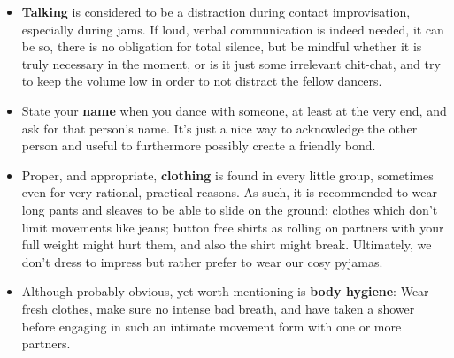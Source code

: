 \begin{itemize}
    \item \textbf{Talking} is considered to be a distraction during contact improvisation, especially during jams.
    If loud, verbal communication is indeed needed, it can be so, there is no obligation for total silence, but be mindful whether it is truly necessary in the moment, or is it just some irrelevant chit-chat, and try to keep the volume low in order to not distract the fellow dancers.
    \item State your \textbf{name} when you dance with someone, at least at the very end, and ask for that person's name.
    It's just a nice way to acknowledge the other person and useful to furthermore possibly create a friendly bond.
    \item Proper, and appropriate, \textbf{clothing} is found in every little group, sometimes even for very rational, practical reasons.
    As such, it is recommended to wear long pants and sleaves to be able to slide on the ground; clothes which don't limit movements like jeans; button free shirts as rolling on partners with your full weight might hurt them, and also the shirt might break.
    Ultimately, we don't dress to impress but rather prefer to wear our cosy pyjamas.
    \item Although probably obvious, yet worth mentioning is \textbf{body hygiene}: Wear fresh clothes, make sure no intense bad breath, and have taken a shower before engaging in such an intimate movement form with one or more partners.
\end{itemize}
